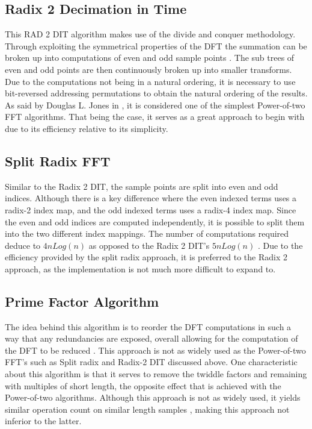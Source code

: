 \documentclass[journal]{IEEEtran}
\begin{document}
	\subsection{Radix 2 Decimation in Time}
		\par{
			This RAD 2 DIT algorithm makes use of the divide and conquer methodology. Through exploiting 
			the symmetrical properties of the DFT the summation can be broken up into computations of even 
			and odd sample points \cite{Soni}. The sub trees of even and odd points are then continuously 
			broken up into smaller transforms. Due to the computations not being in a natural ordering,
			it is necessary to use bit-reversed addressing permutations to obtain the natural ordering of the results. As said by 
			Douglas L. Jones in \cite{Cnx}, it is considered one of the simplest Power-of-two FFT algorithms. 
			That being the case, it serves as a great approach to begin with due to its efficiency relative to 
			its simplicity.
		}
	\subsection{Split Radix FFT}
		\par{
			Similar to the Radix 2 DIT, the sample points are split into even and odd indices. Although there is 
			a key difference where the even indexed terms uses a radix-2 index map, and the odd indexed terms uses 
			a radix-4 index map. Since the even and odd indices are computed independently, it is possible to split 
			them into the two different index mappings. The number of computations required deduce to ${4n Log(n)}$ 
			as opposed to the Radix 2 DIT's ${5n Log(n)}$ \cite{Soni}. Due to the efficiency provided by the split 
			radix approach, it is preferred to the Radix 2 approach, as the implementation is not much more difficult 
			to expand to.
		}

	\subsection{Prime Factor Algorithm}
		\par{
			The idea behind this algorithm is to reorder the DFT computations in such a way that any redundancies 
			are exposed, overall allowing for the computation of the DFT to be reduced \cite{Cnx}. 
			This approach is not as widely used as the Power-of-two FFT's such as Split radix and Radix-2 DIT discussed above. 
			One characteristic about this algorithm is that it serves to remove the twiddle factors and remaining with multiples 
			of short length, the opposite effect that is achieved with the Power-of-two algorithms. Although this approach is not 
			as widely used, it yields similar operation count on similar length samples \cite{Cnx}, making this approach not 
			inferior to the latter.
		}
\end{document}
